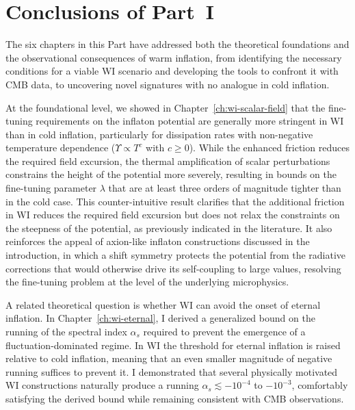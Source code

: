 \chapter*{Conclusions of Part~I}
\label{ch:part1-concl}

The six chapters in this Part have addressed both the theoretical foundations and the observational consequences of warm inflation, from identifying the necessary conditions for a viable WI scenario and developing the tools to confront it with CMB data, to uncovering novel signatures with no analogue in cold inflation.

At the foundational level, we showed in Chapter~\ref{ch:wi-scalar-field} that the fine-tuning requirements on the inflaton potential are generally more stringent in WI than in cold inflation, particularly for dissipation rates with non-negative temperature dependence ($\Upsilon \propto T^c$ with $c \geq 0$). While the enhanced friction reduces the required field excursion, the thermal amplification of scalar perturbations constrains the height of the potential more severely, resulting in bounds on the fine-tuning parameter $\lambda$ that are at least three orders of magnitude tighter than in the cold case. This counter-intuitive result clarifies that the additional friction in WI reduces the required field excursion but does not relax the constraints on the steepness of the potential, as previously indicated in the literature.  It also reinforces the appeal of axion-like inflaton constructions discussed in the introduction,  in which a shift symmetry protects the potential from the radiative corrections that would otherwise drive its self-coupling to large values, resolving the fine-tuning problem at the level of the underlying microphysics.

A related theoretical question is whether WI can avoid the onset of eternal inflation. In Chapter~\ref{ch:wi-eternal}, I derived a generalized bound on the running of the spectral index $\alpha_s$ required to prevent the emergence of a fluctuation-dominated regime. In WI the threshold for eternal inflation is raised relative to cold inflation, meaning that an even smaller magnitude of negative running suffices to prevent it. I demonstrated that several physically motivated WI constructions naturally produce a running $\alpha_s\lesssim -10^{-4}$ to $-10^{-3}$, comfortably satisfying the derived bound while remaining consistent with CMB observations.


